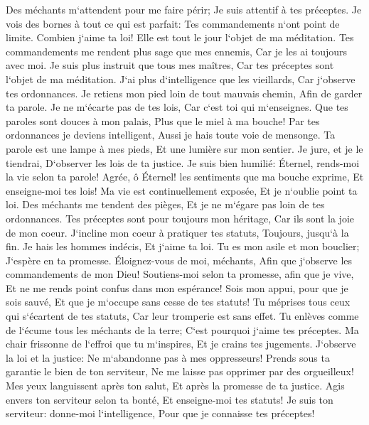 \verse Des méchants m`attendent pour me faire périr; Je suis attentif à tes préceptes. 
\verse Je vois des bornes à tout ce qui est parfait: Tes commandements n`ont point de limite. 
\verse Combien j`aime ta loi! Elle est tout le jour l`objet de ma méditation. 
\verse Tes commandements me rendent plus sage que mes ennemis, Car je les ai toujours avec moi. 
\verse Je suis plus instruit que tous mes maîtres, Car tes préceptes sont l`objet de ma méditation. 
\verse J`ai plus d`intelligence que les vieillards, Car j`observe tes ordonnances. 
\verse Je retiens mon pied loin de tout mauvais chemin, Afin de garder ta parole. 
\verse Je ne m`écarte pas de tes lois, Car c`est toi qui m`enseignes. 
\verse Que tes paroles sont douces à mon palais, Plus que le miel à ma bouche! 
\verse Par tes ordonnances je deviens intelligent, Aussi je hais toute voie de mensonge. 
\verse Ta parole est une lampe à mes pieds, Et une lumière sur mon sentier. 
\verse Je jure, et je le tiendrai, D`observer les lois de ta justice. 
\verse Je suis bien humilié: Éternel, rends-moi la vie selon ta parole! 
\verse Agrée, ô Éternel! les sentiments que ma bouche exprime, Et enseigne-moi tes lois! 
\verse Ma vie est continuellement exposée, Et je n`oublie point ta loi. 
\verse Des méchants me tendent des pièges, Et je ne m`égare pas loin de tes ordonnances. 
\verse Tes préceptes sont pour toujours mon héritage, Car ils sont la joie de mon coeur. 
\verse J`incline mon coeur à pratiquer tes statuts, Toujours, jusqu`à la fin. 
\verse Je hais les hommes indécis, Et j`aime ta loi. 
\verse Tu es mon asile et mon bouclier; J`espère en ta promesse. 
\verse Éloignez-vous de moi, méchants, Afin que j`observe les commandements de mon Dieu! 
\verse Soutiens-moi selon ta promesse, afin que je vive, Et ne me rends point confus dans mon espérance! 
\verse Sois mon appui, pour que je sois sauvé, Et que je m`occupe sans cesse de tes statuts! 
\verse Tu méprises tous ceux qui s`écartent de tes statuts, Car leur tromperie est sans effet. 
\verse Tu enlèves comme de l`écume tous les méchants de la terre; C`est pourquoi j`aime tes préceptes. 
\verse Ma chair frissonne de l`effroi que tu m`inspires, Et je crains tes jugements. 
\verse J`observe la loi et la justice: Ne m`abandonne pas à mes oppresseurs! 
\verse Prends sous ta garantie le bien de ton serviteur, Ne me laisse pas opprimer par des orgueilleux! 
\verse Mes yeux languissent après ton salut, Et après la promesse de ta justice. 
\verse Agis envers ton serviteur selon ta bonté, Et enseigne-moi tes statuts! 
\verse Je suis ton serviteur: donne-moi l`intelligence, Pour que je connaisse tes préceptes! 
